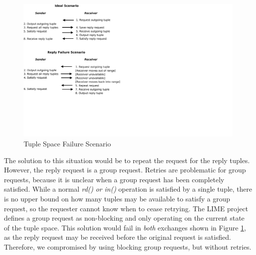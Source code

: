\begin{figure}
\centering
\includegraphics[scale = 1 , clip, trim = 0px 180px 450px 230px]{figures/tuple-failure.pdf}
\caption{Tuple Space Failure Scenario}
\label{fig:tuple-failure}
\end{figure}

The solution to this situation would be to repeat the request for the reply tuples. However, the reply request is a group request. Retries are problematic for group requests, because it is unclear when a group request has been completely satisfied. While a normal \textit{rd()} \textit{or in()} operation is satisfied by a single tuple, there is no upper bound on how many tuples may be available to satisfy a group request, so the requester cannot know when to cease retrying. The LIME\cite{lime} project defines a group request as non-blocking and only operating on the current state of the tuple space. This solution would fail in \textit{both} exchanges shown in Figure \ref{fig:tuple-failure}, as the reply request may be received before the original request is satisfied. Therefore, we compromised by using blocking group requests, but without retries.

